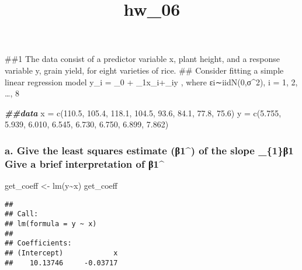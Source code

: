 \documentclass[
]{article}
\title{hw\_06}
\author{}
\date{\vspace{-2.5em}}
\newenvironment{Shaded}{\begin{snugshade}}{\end{snugshade}}
\newcommand{\DocumentationTok}[1]{\textcolor[rgb]{0.56,0.35,0.01}{\textbf{\textit{#1}}}}
\newcommand{\FloatTok}[1]{\textcolor[rgb]{0.00,0.00,0.81}{#1}}
\newcommand{\FunctionTok}[1]{\textcolor[rgb]{0.00,0.00,0.00}{#1}}
\newcommand{\NormalTok}[1]{#1}
\newcommand{\OtherTok}[1]{\textcolor[rgb]{0.56,0.35,0.01}{#1}}
\newcommand{\SpecialCharTok}[1]{\textcolor[rgb]{0.00,0.00,0.00}{#1}}
\begin{document}
\maketitle

\#\#1 The data consist of a predictor variable x, plant height, and a
response variable y, grain yield, for eight varieties of rice. \#\#
Consider fitting a simple linear regression model y\_i = \beta\_0 +
\beta\_1x\_i+\varepsilon\_iy , where εi∼iidN(0,σ\^{}2), i = 1, 2,
\ldots, 8

\begin{Shaded}
\begin{Highlighting}[]
\DocumentationTok{\#\#data}
\NormalTok{x }\OtherTok{=} \FunctionTok{c}\NormalTok{(}\FloatTok{110.5}\NormalTok{, }\FloatTok{105.4}\NormalTok{, }\FloatTok{118.1}\NormalTok{, }\FloatTok{104.5}\NormalTok{, }\FloatTok{93.6}\NormalTok{, }\FloatTok{84.1}\NormalTok{, }\FloatTok{77.8}\NormalTok{, }\FloatTok{75.6}\NormalTok{)}
\NormalTok{y }\OtherTok{=} \FunctionTok{c}\NormalTok{(}\FloatTok{5.755}\NormalTok{, }\FloatTok{5.939}\NormalTok{, }\FloatTok{6.010}\NormalTok{, }\FloatTok{6.545}\NormalTok{, }\FloatTok{6.730}\NormalTok{, }\FloatTok{6.750}\NormalTok{, }\FloatTok{6.899}\NormalTok{, }\FloatTok{7.862}\NormalTok{)}
\end{Highlighting}
\end{Shaded}

\hypertarget{a.-give-the-least-squares-estimate-ux3b21-of-the-slope-_1ux3b21-give-a-brief-interpretation-of-ux3b21}{%
\subsubsection{\texorpdfstring{a. Give the least squares estimate
(β1\^{}) of the slope \beta\_\{1\}β1 Give a brief
interpretation of
β1\^{}}{a. Give the least squares estimate (β1\^{}) of the slope \_\{1\}β1 Give a brief interpretation of β1\^{}}}\label{a.-give-the-least-squares-estimate-ux3b21-of-the-slope-_1ux3b21-give-a-brief-interpretation-of-ux3b21}}

\begin{Shaded}
\begin{Highlighting}[]
\NormalTok{get\_coeff }\OtherTok{\textless{}{-}} \FunctionTok{lm}\NormalTok{(y}\SpecialCharTok{\textasciitilde{}}\NormalTok{x)}
\NormalTok{get\_coeff}
\end{Highlighting}
\end{Shaded}

\begin{verbatim}
## 
## Call:
## lm(formula = y ~ x)
## 
## Coefficients:
## (Intercept)            x  
##    10.13746     -0.03717
\end{verbatim}
\end{document}
